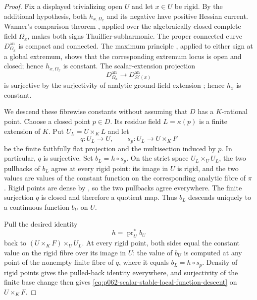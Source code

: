 \begin{proof}
Fix a displayed trivializing open $U$ and let $x\in U$ be rigid.  By the
additional hypothesis, both $h_{x,\Omega_x}$ and its negative have positive
Hessian current.  Wanner's comparison theorem
\cite[Theorem~4.7 and Corollary~4.8]{Wanner19}, applied over the
algebraically closed complete field $\Omega_x$, makes both signs
Thuillier-subharmonic.  The proper connected curve
$D_{\Omega_x}^{\mathrm{an}}$ is compact and connected.  The maximum
principle \cite[Proposition~3.1.11]{Thu05}, applied to either sign at a
global extremum, shows that the corresponding extremum locus is open and
closed; hence $h_{x,\Omega_x}$ is constant.  The scalar-extension projection
\[
       D_{\Omega_x}^{\mathrm{an}}\longrightarrow
       D_{\mathscr H(x)}^{\mathrm{an}}
\]
is surjective by the surjectivity of analytic ground-field extension
\cite[\S1.3]{Berk12}; hence $h_x$ is constant.

We descend these fibrewise constants without assuming that $D$ has a
$K$-rational point.  Choose a closed point $p\in D$.  Its residue field
$L=\kappa(p)$ is a finite extension of $K$.  Put
$U_L=U\times_KL$ and let
\[
 q:U_L\longrightarrow U,
 \qquad
 s_p:U_L\longrightarrow U\times_KF
\]
be the finite faithfully flat projection and the multisection induced by
$p$.  In particular, $q$ is surjective.  Set
$b_L=h\circ s_p$.  On the strict space $U_L\times_UU_L$, the two pullbacks
of $b_L$ agree at every rigid point: its image in $U$ is rigid, and the two
values are values of the constant function on the corresponding analytic
fibre of $\pi$.  Rigid points are dense by
\cite[Proposition~2.1.15]{Berk12}, so the two pullbacks agree everywhere.
The finite surjection $q$ is closed and therefore a quotient map.  Thus
$b_L$ descends uniquely to a continuous function $b_U$ on $U$.

Pull the desired identity
\[
                         h=\operatorname{pr}_U^*b_U
 \label{eq:p062-scalar-stable-local-function-descent}
\]
back to $(U\times_KF)\times_UU_L$.  At every rigid point, both sides equal
the constant value on the rigid fibre over its image in $U$: the value of
$b_U$ is computed at any point of the nonempty finite fibre of $q$, where
it equals $b_L=h\circ s_p$.  Density of rigid points gives the pulled-back
identity everywhere, and surjectivity of the finite base change then gives
\eqref{eq:p062-scalar-stable-local-function-descent} on $U\times_KF$.


\end{proof}
